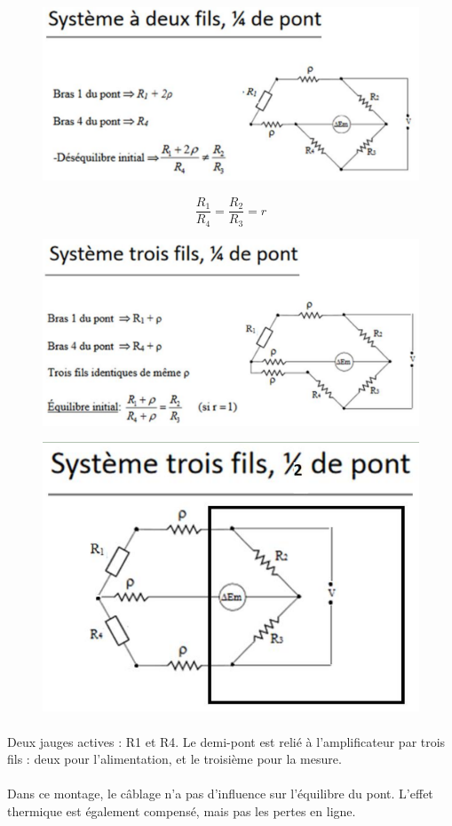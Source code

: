 \documentclass{article}
\begin{document}
\begin{figure}[H]
    \centering
    \includegraphics[width=0.65\linewidth]{./images/wheatstone-2fils.png}
\end{figure}

$$\frac{R_1}{R_4} = \frac{R_2}{R_3} = r$$

\begin{figure}[H]
    \centering
    \includegraphics[width=0.65\linewidth]{./images/wheatstone-3fils-1.png}
\end{figure}

\begin{figure}[H]
    \centering
    \includegraphics[width=0.45\linewidth]{./images/wheatstone-3fils-3.png}
\end{figure}

\paragraph{}
Deux jauges actives : R1 et R4. Le demi-pont est relié à l'amplificateur par trois fils : deux pour l'alimentation, et le troisième pour la mesure.

\paragraph{}
Dans ce montage, le câblage n'a pas d'influence sur l'équilibre du pont. L'effet thermique est également compensé, mais pas les pertes en ligne.
\end{document}

